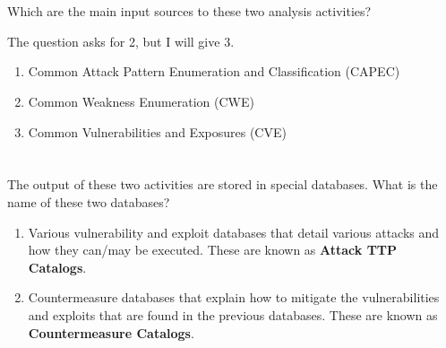 \begin{questions}
  \begin{parts}
  \part{} Which are the main input sources to these two analysis activities?
    \begin{solution}
      The question asks for 2, but I will give 3.
      \begin{enumerate}[noitemsep]
      \item Common Attack Pattern Enumeration and Classification (CAPEC)
      \item Common Weakness Enumeration (CWE)
      \item Common Vulnerabilities and Exposures (CVE)
      \end{enumerate}
    \end{solution}

  \part{} The output of these two activities are stored in special databases. What is the name of these two databases?
    \begin{solution}
      \begin{enumerate}[noitemsep]
      \item Various vulnerability and exploit databases that detail various attacks and how they can/may be executed.
        These are known as \textbf{Attack TTP Catalogs}.
      \item Countermeasure databases that explain how to mitigate the vulnerabilities and exploits that are found in the previous databases.
        These are known as \textbf{Countermeasure Catalogs}.
      \end{enumerate}
    \end{solution}
  \end{parts}


\end{questions}
